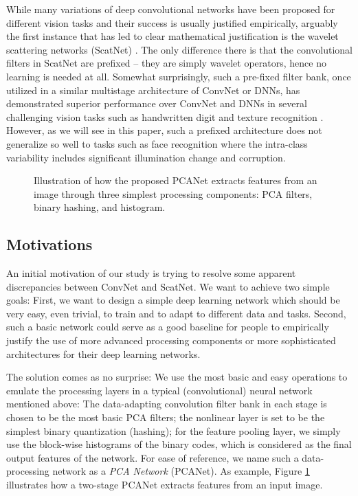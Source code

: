 \documentclass[10pt,journal,compsoc]{IEEEtran}
\begin{document}
While many variations of deep convolutional networks have been proposed for different vision tasks and their success is usually justified empirically, arguably the first instance that has led to clear mathematical justification is the wavelet scattering networks (ScatNet) \cite{Bruna2013,Sifre2013}. The only difference there is that the convolutional filters in ScatNet are prefixed -- they are simply wavelet operators, hence no learning is needed at all. Somewhat surprisingly, such a pre-fixed filter bank, once utilized in a similar multistage architecture of ConvNet or DNNs, has demonstrated superior performance over ConvNet and DNNs in several challenging vision tasks such as handwritten digit and texture recognition \cite{Bruna2013,Sifre2013}. However, as we will see in this paper, such a prefixed architecture does not generalize so well to tasks such as face recognition where the intra-class variability includes significant illumination change and corruption.


\begin{figure}[tbp]
\centering
{}
\caption{Illustration of how the proposed PCANet extracts features from an image through three simplest processing components: PCA filters, binary hashing, and histogram. } \label{fig: PCANet_concept}\vspace{-0.3cm}
\end{figure}


\subsection{Motivations}
An initial motivation of our study is trying to resolve some apparent discrepancies between ConvNet and ScatNet. We want to achieve two simple goals: First, we want to design a simple deep learning network which should be very easy, even trivial, to train and to adapt to different data and tasks. Second, such a basic network could serve as a good baseline for people to empirically justify the use of more advanced processing components or more sophisticated architectures for their deep learning networks.

The solution comes as no surprise: We use the most basic and easy operations to emulate the processing layers in a typical (convolutional) neural network mentioned above: The data-adapting convolution filter bank in each stage is chosen to be the most basic PCA filters; the nonlinear layer is set to be the simplest binary quantization (hashing); for the feature pooling layer, we simply use the block-wise histograms of the binary codes, which is considered as the final output features of the network. For ease of reference, we name such a data-processing network as a {\em PCA Network} (PCANet). As example, Figure \ref{fig: PCANet_concept} illustrates how a two-stage PCANet extracts features from an input image.
\end{document}
